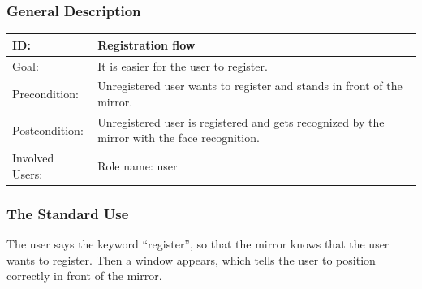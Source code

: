 \documentclass[12pt]{article}
\theoremstyle{definition}
\begin{document}
\subsubsection{General Description}
\begin{tabular}{|p{.2\linewidth}|p{.65\linewidth}|}
\hline 
ID: & Registration flow\\ \hline
Goal: & It is easier for the user to register.\\ \hline
Precondition: & Unregistered user wants to register and stands in front of the mirror.\\ \hline
Postcondition: &  Unregistered user is registered and gets recognized by the mirror with the face recognition. \\ \hline
Involved Users: & Role name: user \\ \hline
\end{tabular}

\subsubsection{The Standard Use}
The user says the keyword ``register'', so that the mirror knows that the user wants to register. Then a window appears, which tells the user to position correctly in front of the mirror.\\\\
\end{document}
